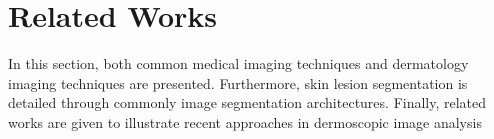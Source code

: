 \chapter{Related Works}

    In this section, both common medical imaging techniques and dermatology imaging techniques are presented.
    Furthermore, skin lesion segmentation is detailed through commonly image segmentation architectures.
    Finally, related works are given to illustrate recent approaches in dermoscopic image analysis

    

    

    
